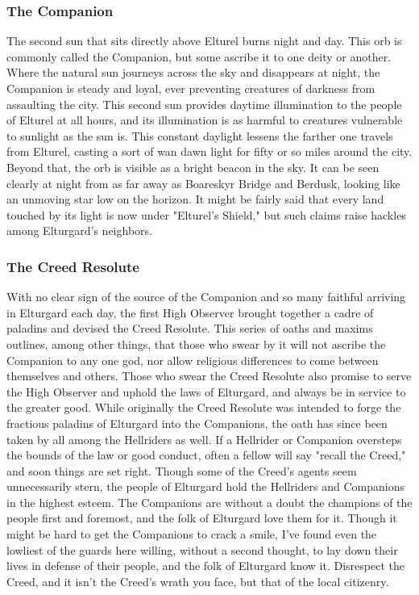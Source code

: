 \documentclass[10pt,a4paper,twoside,twocolumn,openany,bg=print,nodeprecatedcode]{dndbook}
\begin{document}
\subsubsection{The Companion}
The second sun that sits directly above Elturel burns night and day. This orb is commonly called the Companion, but some ascribe it to one deity or another. Where the natural sun journeys across the sky and disappears at night, the Companion is steady and loyal, ever preventing creatures of darkness from assaulting the city.
This second sun provides daytime illumination to the people of Elturel at all hours, and its illumination is as harmful to creatures vulnerable to sunlight as the sun is. This constant daylight lessens the farther one travels from Elturel, casting a sort of wan dawn light for fifty or so miles around the city. Beyond that, the orb is visible as a bright beacon in the sky. It can be seen clearly at night from as far away as Boareskyr Bridge and Berdusk, looking like an unmoving star low on the horizon. It might be fairly said that every land touched by its light is now under "Elturel's Shield," but such claims raise hackles among Elturgard's neighbors.
\subsubsection{The Creed Resolute}
With no clear sign of the source of the Companion and so many faithful arriving in Elturgard each day, the first High Observer brought together a cadre of paladins and devised the Creed Resolute. This series of oaths and maxims outlines, among other things, that those who swear by it will not ascribe the Companion to any one god, nor allow religious differences to come between themselves and others. Those who swear the Creed Resolute also promise to serve the High Observer and uphold the laws of Elturgard, and always be in service to the greater good. While originally the Creed Resolute was intended to forge the fractious paladins of Elturgard into the Companions, the oath has since been taken by all among the Hellriders as well. If a Hellrider or Companion oversteps the bounds of the law or good conduct, often a fellow will say "recall the Creed," and soon things are set right.
Though some of the Creed's agents seem unnecessarily stern, the people of Elturgard hold the Hellriders and Companions in the highest esteem. The Companions are without a doubt the champions of the people first and foremost, and the folk of Elturgard love them for it. Though it might be hard to get the Companions to crack a smile, I've found even the lowliest of the guards here willing, without a second thought, to lay down their lives in defense of their people, and the folk of Elturgard know it. Disrespect the Creed, and it isn't the Creed's wrath you face, but that of the local citizenry.
\end{document}
